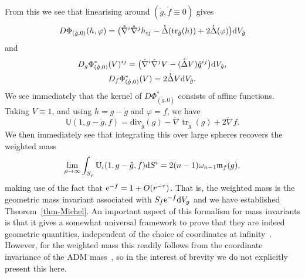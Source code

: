 \documentclass[pdftex]{sigma}
\numberwithin{equation}{section}
\theoremstyle{definition}
\begin{document}
From this we see that linearising around $(\mathring g, \mathring f\equiv0)$ gives
\begin{equation*}
	D\Phi_{(\mathring g,0)}(h,\varphi)=\bigl( 	\mathring{\nabla}^i \mathring{\nabla}^j h_{ij} - \mathring{\Delta}(\operatorname{tr}_{\mathring g}(h)) +2\mathring{\Delta}(\varphi)\bigr){\rm d}V_{\mathring g}
\end{equation*}
and
\begin{gather*}
		D_g\Phi_{(\mathring g,0)}^*(V)^{ij}=   \bigl(\mathring{\nabla}^i \mathring{\nabla}^j V - (\mathring{\Delta} V)  \mathring g^{ij}\bigr){\rm d}V_{\mathring g},\\
		D_f\Phi_{(\mathring g,0)}^*(V)=   2 \mathring{\Delta} V {\rm d}V_{\mathring g}.
\end{gather*}
We see immediately that the kernel of $D\Phi^*_{(\mathring g,0)}$ consists of affine functions. Taking $V\equiv 1$, and using $h=g-\mathring g$ and $\varphi=f$, we have
\[
	\mathbb U(1,g-\mathring g,f)=\mathrm{div}_{\mathring g}(g)-\mathring{\nabla}\operatorname{tr}_{\mathring g}(g)+2\mathring{\nabla} f.
\]
We then immediately see that integrating this over large spheres recovers the weighted mass
\begin{equation*}
	\lim_{\rho\to\infty}\int_{S_\rho}\mathbb U_i(1,g-\mathring g,f){\rm d}S^i=2(n-1)\omega_{n-1}\mathfrak{m}_f(g),
\end{equation*}
making use of the fact that ${\rm e}^{-f}=1+O(r^{-\tau})$. That is, the weighted mass is the geometric mass invariant associated with $S_f{\rm e}^{-f}{\rm d}V_g$ and we have established Theorem~\ref{thm-Michel}. An important aspect of this formalism for mass invariants is that it gives a somewhat universal framework to prove that they are indeed geometric quantities, independent of the choice of coordinates at infinity~\cite{Michel11}. However, for the weighted mass this readily follows from the coordinate invariance of the ADM mass~\cite{BaldaufOzuch22,LawLopezSantiago24}, so in the interest of brevity we do not explicitly present this here.
\end{document}

